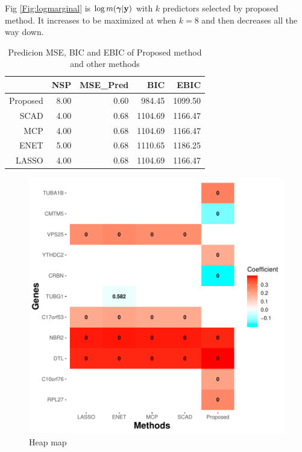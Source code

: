 \documentclass[12pt]{article}
\def\uy{{\bf y}}
\def\bg{{\boldsymbol \gamma}}
\begin{document}
Fig \ref{Fig:logmarginal} is $\log m(\bg|\uy)$ with $k$ predictors selected by proposed method. It increases to be maximized at when $k=8$ and then decreases all the way down.
\begin{table}[ht]
 \centering
 \caption{Predicion MSE, BIC and EBIC of Proposed method and other methods}\label{T:realdata}
 \begin{tabular}{rrrrr}
  \hline
           & NSP  & MSE\_Pred & BIC     & EBIC    \\
  \hline
  Proposed & 8.00 & 0.60      & 984.45  & 1099.50 \\
  SCAD     & 4.00 & 0.68      & 1104.69 & 1166.47 \\
  MCP      & 4.00 & 0.68      & 1104.69 & 1166.47 \\
  ENET     & 5.00 & 0.68      & 1110.65 & 1186.25 \\
  LASSO    & 4.00 & 0.68      & 1104.69 & 1166.47 \\
  \hline
 \end{tabular}
\end{table}

\begin{figure}
 \centering
 \includegraphics{Heatmap.pdf}
 \caption{Heap map}\label{Fig:heatmap}
 \label{fig:heatmap}
\end{figure}
\end{document}
